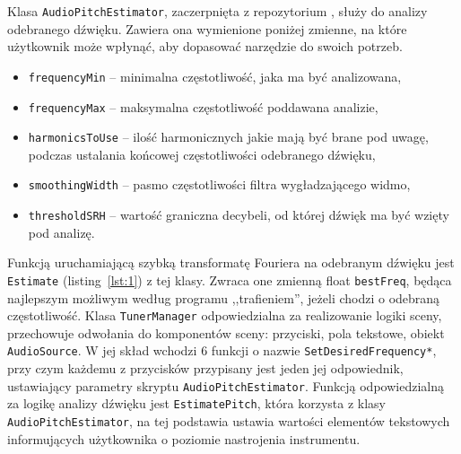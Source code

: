 Klasa \texttt{AudioPitchEstimator}, zaczerpnięta z repozytorium \cite{AudioPitchEstimator}, %
służy do analizy odebranego dźwięku. Zawiera ona wymienione poniżej zmienne, na które użytkownik może wpłynąć, aby dopasować narzędzie do swoich potrzeb.
\begin{itemize}
    \item \texttt{frequencyMin} -- minimalna częstotliwość, jaka ma być analizowana,
    \item \texttt{frequencyMax} -- maksymalna częstotliwość poddawana analizie,
    \item \texttt{harmonicsToUse} -- ilość harmonicznych jakie mają być brane pod uwagę, podczas ustalania końcowej częstotliwości odebranego dźwięku,
    \item \texttt{smoothingWidth} -- pasmo częstotliwości filtra wygładzającego widmo,
    \item \texttt{thresholdSRH} -- wartość graniczna decybeli, od której dźwięk ma być wzięty pod analizę.
\end{itemize}

Funkcją uruchamiającą szybką transformatę Fouriera na odebranym dźwięku jest \texttt{Estimate} (listing~\ref{lst:1}) z tej klasy. Zwraca one zmienną float \texttt{bestFreq}, będąca najlepszym możliwym według programu ,,trafieniem'', jeżeli chodzi o odebraną częstotliwość. Klasa \texttt{TunerManager} odpowiedzialna za realizowanie logiki sceny, przechowuje odwołania do komponentów sceny: przyciski, pola tekstowe, obiekt \texttt{AudioSource}. W jej skład wchodzi 6 funkcji o nazwie \texttt{SetDesiredFrequency*}, przy czym każdemu z przycisków przypisany jest jeden jej odpowiednik, ustawiający parametry skryptu \texttt{AudioPitchEstimator}. Funkcją odpowiedzialną za logikę analizy dźwięku jest \texttt{EstimatePitch}, która korzysta z klasy \texttt{AudioPitchEstimator}, na tej podstawia ustawia wartości elementów tekstowych informujących użytkownika o poziomie nastrojenia instrumentu. 

